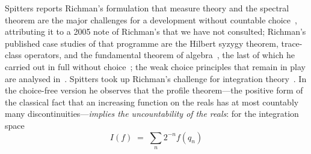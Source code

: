\documentclass[11pt]{article}
\theoremstyle{definition}
\theoremstyle{remark}
\begin{document}
Spitters reports Richman's formulation that measure theory and the spectral theorem are the major challenges for a development without countable choice~\cite[\S1]{spitters-2006-dagstuhl}, attributing it to a 2005 note of Richman's that we have not consulted; Richman's published case studies of that programme are the Hilbert syzygy theorem, trace-class operators, and the fundamental theorem of algebra~\cite{richman-2001}, the last of which he carried out in full without choice~\cite{richman-2000-fta}; the weak choice principles that remain in play are analysed in~\cite{bridges-richman-schuster-2000}.  Spitters took up Richman's challenge for integration theory~\cite{spitters-2006-dagstuhl}.  In the choice-free version he observes that the profile theorem---the positive form of the classical fact that an increasing function on the reals has at most countably many discontinuities---\emph{implies the uncountability of the reals}: for the integration space
\[
I(f) \;=\; \sum_{n} 2^{-n} f(q_n)
\]
\end{document}
